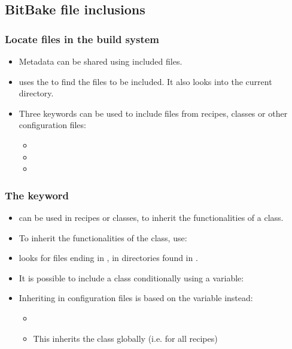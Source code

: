 \subsection{BitBake file inclusions}

\begin{frame}
  \frametitle{Locate files in the build system}
  \begin{itemize}
    \item Metadata can be shared using included files.
    \item {} uses the  to find the files to
      be included. It also looks into the current directory.
    \item Three keywords can be used to include files from recipes,
      classes or other configuration files:
      \begin{itemize}
        \item {}
        \item {}
        \item {}
      \end{itemize}
  \end{itemize}
\end{frame}

\begin{frame}
  \frametitle{The  keyword}
  \begin{itemize}
    \item {} can be used in recipes or classes, to inherit
      the functionalities of a class.
    \item To inherit the functionalities of the  class,
      use: 
    \item {} looks for files ending in , in
       directories found in .
    \item It is possible to include a class conditionally using a
      variable: 
    \item Inheriting in configuration files is based on the 
      variable instead:
      \begin{itemize}
        \item {}
        \item This inherits the class globally (i.e. for all recipes)
      \end{itemize}
  \end{itemize}
\end{frame}


